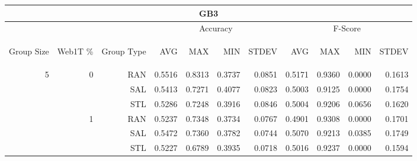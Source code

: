 \begin{center}
\begin{table}[htbp] 
 \begin{center}
\begin{tabular}{ | r | r | r | r | r | r | r | r | r | r | r |}
\hline
\multicolumn{11}{|c|}{GB3}\\
\hline
 & & & \multicolumn{4}{|c|}{Accuracy} & \multicolumn{4}{|c|}{F-Score}\\ \cline{4-11}
\begin{sideways}Group Size\end{sideways} & \begin{sideways}Web1T \%\end{sideways} & \begin{sideways}Group Type\end{sideways} & \begin{sideways}AVG\end{sideways} & \begin{sideways}MAX\end{sideways} & \begin{sideways}MIN\end{sideways} & \begin{sideways}STDEV\end{sideways} & \begin{sideways}AVG\end{sideways} & \begin{sideways}MAX\end{sideways} & \begin{sideways}MIN\end{sideways} & \begin{sideways}STDEV\end{sideways}\\
\hline
\multirow{18}{*}{5}
 & \multirow{3}{*}{0} & RAN & 0.5516 & 0.8313 & 0.3737 & 0.0851 & 0.5171 & 0.9360 & 0.0000 & 0.1613\\ \cline{3-11}
 &   & SAL & 0.5413 & 0.7271 & 0.4077 & 0.0823 & 0.5003 & 0.9125 & 0.0000 & 0.1754\\ \cline{3-11}
 &   & STL & 0.5286 & 0.7248 & 0.3916 & 0.0846 & 0.5004 & 0.9206 & 0.0656 & 0.1620\\ \cline{2-11}
 & \multirow{3}{*}{1} & RAN & 0.5237 & 0.7348 & 0.3734 & 0.0767 & 0.4901 & 0.9308 & 0.0000 & 0.1701\\ \cline{3-11}
 &   & SAL & 0.5472 & 0.7360 & 0.3782 & 0.0744 & 0.5070 & 0.9213 & 0.0385 & 0.1749\\ \cline{3-11}
 &   & STL & 0.5227 & 0.6789 & 0.3935 & 0.0718 & 0.5016 & 0.9237 & 0.0000 & 0.1594\\ \cline{2-11}

\end{tabular}
\end{center}
\end{table}
\end{center}
